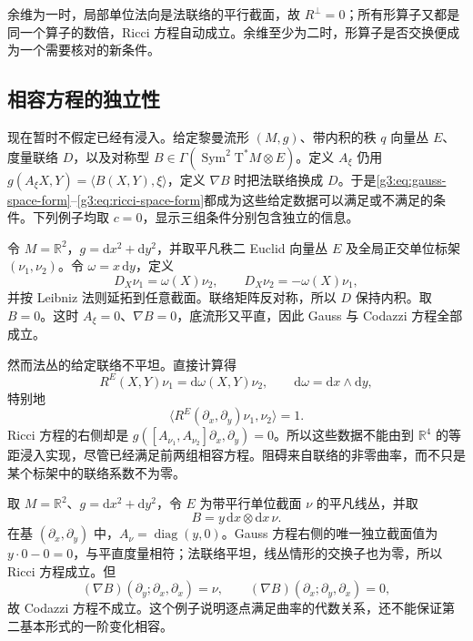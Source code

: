 余维为一时，局部单位法向是法联络的平行截面，故 \(R^\perp=0\)；所有形算子又都是同一个算子的数倍，Ricci 方程自动成立。余维至少为二时，形算子是否交换便成为一个需要核对的新条件。

\subsection{相容方程的独立性}
\label{g3:subsec:0402:04}

现在暂时不假定已经有浸入。给定黎曼流形 \((M,g)\)、带内积的秩 \(q\) 向量丛 \(E\)、度量联络 \(D\)，以及对称型 \(B\in\Gamma(\operatorname{Sym}^2\mathrm{T}^*M\otimes E)\)。定义 \(A_\xi\) 仍用 \(g(A_\xi X,Y)=\langle B(X,Y),\xi\rangle\)，定义 \(\nabla B\) 时把法联络换成 \(D\)。于是\eqref{g3:eq:gauss-space-form}--\eqref{g3:eq:ricci-space-form}都成为这些给定数据可以满足或不满足的条件。下列例子均取 \(c=0\)，显示三组条件分别包含独立的信息。

\begin{example}\label{g3:exm:gauss-codazzi-without-ricci}
	令 \(M=\mathbb R^2\)，\(g=\mathrm dx^2+\mathrm dy^2\)，并取平凡秩二 Euclid 向量丛 \(E\) 及全局正交单位标架 \((\nu_1,\nu_2)\)。令 \(\omega=x\,\mathrm dy\)，定义
	\[
		D_X\nu_1=\omega(X)\nu_2,\qquad
		D_X\nu_2=-\omega(X)\nu_1,
	\]
	并按 Leibniz 法则延拓到任意截面。联络矩阵反对称，所以 \(D\) 保持内积。取 \(B=0\)。这时 \(A_\xi=0\)、\(\nabla B=0\)，底流形又平直，因此 Gauss 与 Codazzi 方程全部成立。

	然而法丛的给定联络不平坦。直接计算得
	\[
		R^E(X,Y)\nu_1=\mathrm d\omega(X,Y)\nu_2,
		\qquad \mathrm d\omega=\mathrm dx\wedge\mathrm dy,
	\]
	特别地
	\[
		\langle R^E(\partial_x,\partial_y)\nu_1,\nu_2\rangle=1.
	\]
	Ricci 方程的右侧却是 \(g([A_{\nu_1},A_{\nu_2}]\partial_x,\partial_y)=0\)。所以这些数据不能由到 \(\mathbb R^4\) 的等距浸入实现，尽管已经满足前两组相容方程。阻碍来自联络的非零曲率，而不只是某个标架中的联络系数不为零。
\end{example}

\begin{example}\label{g3:exm:gauss-ricci-without-codazzi}
	取 \(M=\mathbb R^2\)、\(g=\mathrm dx^2+\mathrm dy^2\)，令 \(E\) 为带平行单位截面 \(\nu\) 的平凡线丛，并取
	\[
		B=y\,\mathrm dx\otimes\mathrm dx\,\nu.
	\]
	在基 \((\partial_x,\partial_y)\) 中，\(A_\nu=\operatorname{diag}(y,0)\)。Gauss 方程右侧的唯一独立截面值为 \(y\cdot0-0=0\)，与平直度量相符；法联络平坦，线丛情形的交换子也为零，所以 Ricci 方程成立。但
	\[
		(\nabla B)(\partial_y;\partial_x,\partial_x)=\nu,
		\qquad
		(\nabla B)(\partial_x;\partial_y,\partial_x)=0,
	\]
	故 Codazzi 方程不成立。这个例子说明逐点满足曲率的代数关系，还不能保证第二基本形式的一阶变化相容。
\end{example}


